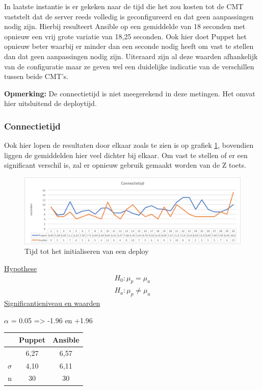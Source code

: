 In laatste instantie is er gekeken naar de tijd die het zou kosten tot de CMT vaststelt dat de server reeds volledig is geconfigureerd en dat geen aanpassingen nodig zijn. Hierbij resulteert Ansible op een gemiddelde van 18 seconden met opnieuw een vrij grote variatie van 18,25 seconden. Ook hier doet Puppet het opnieuw beter waarbij er minder dan een seconde nodig heeft om vast te stellen dan dat geen aanpassingen nodig zijn. Uiteraard zijn al deze waarden afhankelijk van de configuratie maar ze geven wel een duidelijke indicatie van de verschillen tussen beide CMT's.

\textbf{Opmerking:} De connectietijd is niet meegerekend in deze metingen. Het omvat hier uitsluitend de deploytijd.
\subsubsection{Connectietijd}
Ook hier lopen de resultaten door elkaar zoals te zien is op grafiek \ref{fig:connectiontime}, bovendien liggen de gemiddelden hier veel dichter bij elkaar. Om vast te stellen of er een significant verschil is, zal er opnieuw gebruik gemaakt worden van de Z toets.
\begin{figure}
  \includegraphics[width=\linewidth]{img/connectiontime.png} 
  \caption{Tijd tot het initialiseren van een deploy}  
  \label{fig:connectiontime}
\end{figure}



\underline{Hypothese}
\begin{align*}
H_0:  \mu_p = \mu_a \\
H_a: \mu_p\neq \mu_a 
\end{align*}
\underline{Significantieniveau en waarden} \newline

 $\alpha$ = 0.05 => -1.96 en +1.96 \newline

		\begin{tabular}{ r |c |c }
			& Puppet & Ansible\\\hline
			\unexpanded{$ \bar x  $} &  6,27 & 6,57\\ \hline
			$\sigma$ & 4,10 & 6,11\\ \hline
			n &  30 &  30

\end{tabular}


